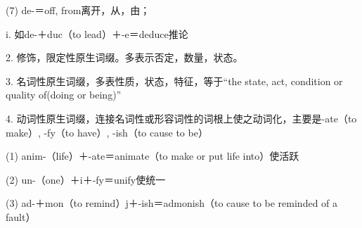 (7)	de-＝off, from离开，从，由；

i.	如de-＋duc（to lead）＋-e＝deduce推论

2.	修饰，限定性原生词缀。多表示否定，数量，状态。

3.	名词性原生词缀，多表性质，状态，特征，等于“the state, act, condition or quality of(doing or being)”

4.	动词性原生词缀，连接名词性或形容词性的词根上使之动词化，主要是-ate（to make）, -fy（to have）, -ish（to cause to be）

(1)	anim-（life）＋-ate＝animate（to make or put life into）使活跃

(2)	un-（one）＋i＋-fy＝unify使统一

(3)	ad-＋mon（to remind）j＋-ish＝admonish（to cause to be reminded of a fault）

